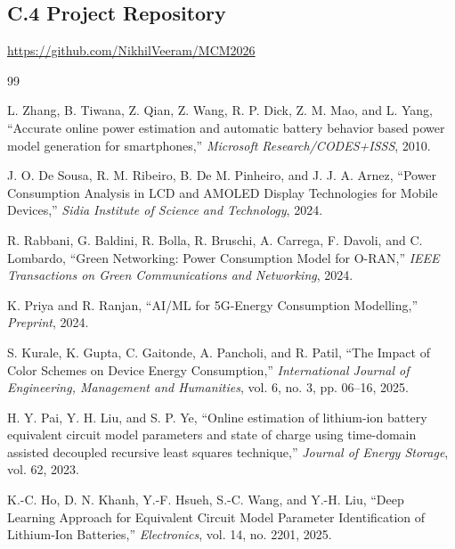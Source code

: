 \documentclass[12pt]{article}
\begin{document}
\subsection*{C.4 Project Repository}
\begin{center}
\Large\url{https://github.com/NikhilVeeram/MCM2026}
\end{center}

\newpage

\begin{thebibliography}{99}

L. Zhang, B. Tiwana, Z. Qian, Z. Wang, R. P. Dick, Z. M. Mao, and L. Yang, ``Accurate online power estimation and automatic battery behavior based power model generation for smartphones,'' \textit{Microsoft Research/CODES+ISSS}, 2010.

J. O. De Sousa, R. M. Ribeiro, B. De M. Pinheiro, and J. J. A. Arnez, ``Power Consumption Analysis in LCD and AMOLED Display Technologies for Mobile Devices,'' \textit{Sidia Institute of Science and Technology}, 2024.

R. Rabbani, G. Baldini, R. Bolla, R. Bruschi, A. Carrega, F. Davoli, and C. Lombardo, ``Green Networking: Power Consumption Model for O-RAN,'' \textit{IEEE Transactions on Green Communications and Networking}, 2024.

K. Priya and R. Ranjan, ``AI/ML for 5G-Energy Consumption Modelling,'' \textit{Preprint}, 2024.

S. Kurale, K. Gupta, C. Gaitonde, A. Pancholi, and R. Patil, ``The Impact of Color Schemes on Device Energy Consumption,'' \textit{International Journal of Engineering, Management and Humanities}, vol. 6, no. 3, pp. 06--16, 2025.

H. Y. Pai, Y. H. Liu, and S. P. Ye, ``Online estimation of lithium-ion battery equivalent circuit model parameters and state of charge using time-domain assisted decoupled recursive least squares technique,'' \textit{Journal of Energy Storage}, vol. 62, 2023.

K.-C. Ho, D. N. Khanh, Y.-F. Hsueh, S.-C. Wang, and Y.-H. Liu, ``Deep Learning Approach for Equivalent Circuit Model Parameter Identification of Lithium-Ion Batteries,'' \textit{Electronics}, vol. 14, no. 2201, 2025.


\end{thebibliography}
\end{document}

